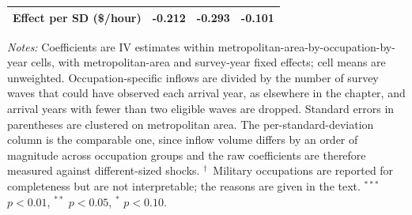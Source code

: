 \begin{table}[!htbp]
{\begin{tabular}{lccc}
\quad Effect per SD (\$/hour) & -0.212 & -0.293 & -0.101\\
\bottomrule
\end{tabular}
}
\begin{minipage}{\textwidth}
\footnotesize
\vspace{4pt}
\textit{Notes:} Coefficients are IV estimates within metropolitan-area-by-occupation-by-year cells, with metropolitan-area and survey-year fixed effects; cell means are unweighted. Occupation-specific inflows are divided by the number of survey waves that could have observed each arrival year, as elsewhere in the chapter, and arrival years with fewer than two eligible waves are dropped. Standard errors in parentheses are clustered on metropolitan area. The per-standard-deviation column is the comparable one, since inflow volume differs by an order of magnitude across occupation groups and the raw coefficients are therefore measured against different-sized shocks. $^{\dagger}$~Military occupations are reported for completeness but are not interpretable; the reasons are given in the text. $^{***}$ $p<0.01$, $^{**}$ $p<0.05$, $^{*}$ $p<0.10$.
\end{minipage}
\end{table}

